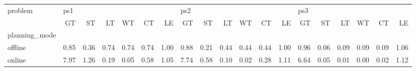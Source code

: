 \begin{tabular}{lrrrrrrrrrrrrrrrrrr}
\toprule
problem & \multicolumn{6}{l}{ps1} & \multicolumn{6}{l}{ps2} & \multicolumn{6}{l}{ps3} \\
{} &   GT &   ST &   LT &   WT &   CT &   LE &   GT &   ST &   LT &   WT &   CT &   LE &   GT &   ST &   LT &   WT &   CT &   LE \\
planning\_mode &      &      &      &      &      &      &      &      &      &      &      &      &      &      &      &      &      &      \\
\midrule
offline       & 0.85 & 0.36 & 0.74 & 0.74 & 0.74 & 1.00 & 0.88 & 0.21 & 0.44 & 0.44 & 0.44 & 1.00 & 0.96 & 0.06 & 0.09 & 0.09 & 0.09 & 1.06 \\
online        & 7.97 & 1.26 & 0.19 & 0.05 & 0.58 & 1.05 & 7.74 & 0.58 & 0.10 & 0.02 & 0.28 & 1.11 & 6.64 & 0.05 & 0.01 & 0.00 & 0.02 & 1.12 \\
\bottomrule
\end{tabular}
